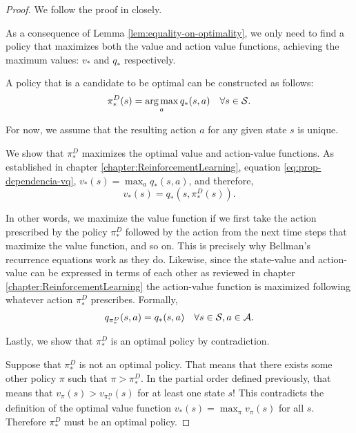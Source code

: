 \begin{proof}
    We follow the proof in \cite[pg.~115]{raoRL4F} closely.

    As a consequence of Lemma \ref{lem:equality-on-optimality}, we only need to
    find a policy that maximizes both the value and action value functions,
    achieving the maximum values: $v_*$ and $q_*$ respectively.

    A policy that is a candidate to be optimal can be constructed as follows:
    \begin{equation}
        \label{eq:greedy-policy-construction}
        \pi_{*}^{D} (s) = \operatorname*{arg\,max}_{a} q_{*} (s, a) \quad \forall s \in \mathcal{S}.
    \end{equation}

    For now, we assume that the resulting action $a$ for any given state $s$ is
    unique.

    We show that $\pi_{*}^{D}$ maximizes the optimal value and action-value
    functions. As established in chapter \ref{chapter:ReinforcementLearning},
    equation \eqref{eq:prop-dependencia-vq}, $v_* (s) = \max_a q_* (s, a)$, and
    therefore,
    \[
        v_* (s) = q_* \left(s, \pi_{*}^{D}(s) \right).
    \]

    In other words, we maximize the value function if we first take the action
    prescribed by the policy $\pi_{*}^{D}$ followed by the action from the next
    time steps that maximize the value function, and so on. This is precisely
    why Bellman's recurrence equations work as they do. Likewise, since the
    state-value and action-value can be expressed in terms of each other as
    reviewed in chapter \ref{chapter:ReinforcementLearning} the action-value
    function is maximized following whatever action $\pi_{*}^{D}$ prescribes.
    Formally,
    \[
        q_{\pi_{*}^{D}} (s, a) = q_* (s,a) \quad \forall s \in \mathcal{S}, a \in \mathcal{A}.
    \]

    Lastly, we show that $\pi_{*}^{D}$ is an optimal policy by contradiction.

    Suppose that $\pi_{*}^{D}$ is not an optimal policy. That means that there
    exists some other policy $\pi$ such that $\pi > \pi_{*}^{D}$. In the partial
    order defined previously, that means that $v_{\pi} (s) > v_{\pi_{*}^{D}}
    (s)$ for at least one state $s$! This contradicts the definition of the
    optimal value function $v_* (s) = \max_\pi v_\pi (s)$ for all $s$. Therefore
    $\pi_{*}^{D}$ must be an optimal policy.
\end{proof}

